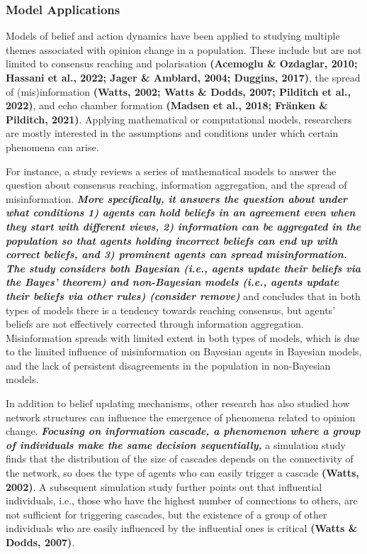 \documentclass[
  11pt,
]{article}
\begin{document}
\hypertarget{model-applications}{%
\subsubsection{Model Applications}\label{model-applications}}

Models of belief and action dynamics have been applied to studying
multiple themes associated with opinion change in a population. These
include but are not limited to consensus reaching and polarisation
\textbf{(Acemoglu \& Ozdaglar, 2010; Hassani et al., 2022; Jager \&
Amblard, 2004; Duggins, 2017)}, the spread of (mis)information
\textbf{(Watts, 2002; Watts \& Dodds, 2007; Pilditch et al., 2022)}, and
echo chamber formation \textbf{(Madsen et al., 2018; Fränken \&
Pilditch, 2021)}. Applying mathematical or computational models,
researchers are mostly interested in the assumptions and conditions
under which certain phenomena can arise.

For instance, a study reviews a series of mathematical models to answer
the question about consensus reaching, information aggregation, and the
spread of misinformation. \textbf{\emph{More specifically, it answers
the question about under what conditions 1) agents can hold beliefs in
an agreement even when they start with different views, 2) information
can be aggregated in the population so that agents holding incorrect
beliefs can end up with correct beliefs, and 3) prominent agents can
spread misinformation. The study considers both Bayesian (i.e., agents
update their beliefs via the Bayes' theorem) and non-Bayesian models
(i.e., agents update their beliefs via other rules) (consider remove)}}
and concludes that in both types of models there is a tendency towards
reaching consensus, but agents' beliefs are not effectively corrected
through information aggregation. Misinformation spreads with limited
extent in both types of models, which is due to the limited influence of
misinformation on Bayesian agents in Bayesian models, and the lack of
persistent disagreements in the population in non-Bayesian models.

In addition to belief updating mechanisms, other research has also
studied how network structures can influence the emergence of phenomena
related to opinion change. \textbf{\emph{Focusing on information
cascade, a phenomenon where a group of individuals make the same
decision sequentially,}} a simulation study finds that the distribution
of the size of cascades depends on the connectivity of the network, so
does the type of agents who can easily trigger a cascade \textbf{(Watts,
2002)}. A subsequent simulation study further points out that
influential individuals, i.e., those who have the highest number of
connections to others, are not sufficient for triggering cascades, but
the existence of a group of other individuals who are easily influenced
by the influential ones is critical \textbf{(Watts \& Dodds, 2007)}.
\end{document}
